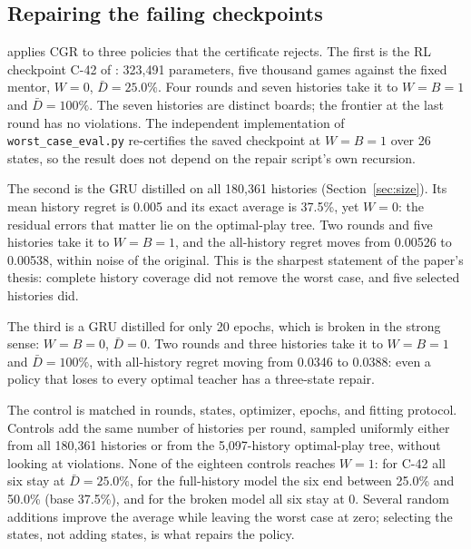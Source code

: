 \documentclass[conference]{IEEEtran}
\begin{document}
\subsection{Repairing the failing checkpoints}
 applies CGR to three policies that the certificate rejects. The first is the RL checkpoint C-42 of : 323{,}491 parameters, five thousand games against the fixed mentor, $W=0$, $\bar D=25.0\%$. Four rounds and seven histories take it to $W=B=1$ and $\bar D=100\%$. The seven histories are distinct boards; the frontier at the last round has no violations. The independent implementation of \texttt{worst\_case\_eval.py} re-certifies the saved checkpoint at $W=B=1$ over 26 states, so the result does not depend on the repair script's own recursion.

The second is the GRU distilled on all 180{,}361 histories (Section~\ref{sec:size}). Its mean history regret is 0.005 and its exact average is 37.5\%, yet $W=0$: the residual errors that matter lie on the optimal-play tree. Two rounds and five histories take it to $W=B=1$, and the all-history regret moves from 0.00526 to 0.00538, within noise of the original. This is the sharpest statement of the paper's thesis: complete history coverage did not remove the worst case, and five selected histories did.

The third is a GRU distilled for only 20 epochs, which is broken in the strong sense: $W=B=0$, $\bar D=0$. Two rounds and three histories take it to $W=B=1$ and $\bar D=100\%$, with all-history regret moving from 0.0346 to 0.0388: even a policy that loses to every optimal teacher has a three-state repair.

The control is matched in rounds, states, optimizer, epochs, and fitting protocol. Controls add the same number of histories per round, sampled uniformly either from all 180{,}361 histories or from the 5{,}097-history optimal-play tree, without looking at violations. None of the eighteen controls reaches $W=1$: for C-42 all six stay at $\bar D=25.0\%$, for the full-history model the six end between 25.0\% and 50.0\% (base 37.5\%), and for the broken model all six stay at 0. Several random additions improve the average while leaving the worst case at zero; selecting the states, not adding states, is what repairs the policy.
\end{document}
